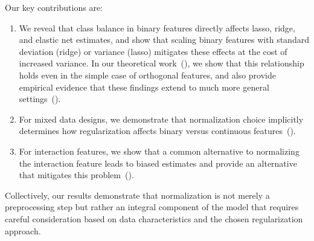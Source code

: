 Our key contributions are:
\begin{enumerate}
  \item We reveal that class balance in binary features directly affects lasso, ridge, and elastic
        net estimates, and show that scaling binary features with standard deviation (ridge) or
        variance (lasso) mitigates these effects at the cost of increased variance. In our
        theoretical work~(), we show that this relationship holds
        even in the simple case of orthogonal features, and also provide empirical evidence that
        these findings extend to much more general settings~().
  \item For mixed data designs, we demonstrate that normalization choice implicitly determines how
        regularization affects binary versus continuous features~().
  \item For interaction features, we show that a common alternative to normalizing the interaction
        feature leads to biased estimates and provide an alternative that mitigates this
        problem~().
\end{enumerate}

Collectively, our results demonstrate that normalization is not merely a preprocessing step
but rather an integral component of the model that requires careful consideration based on
data characteristics and the chosen regularization approach.
